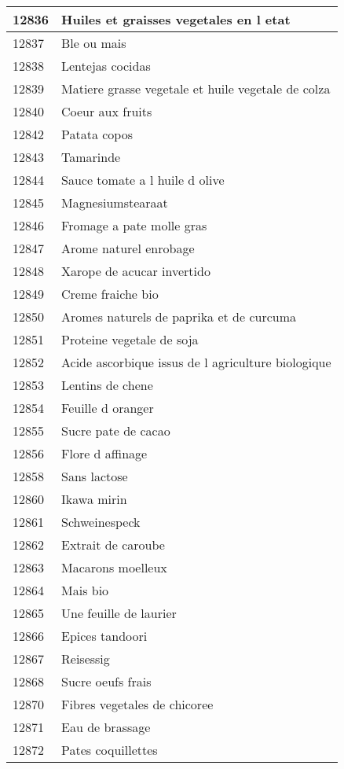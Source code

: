 \begin{longtable}{|l|l|}
12836 & Huiles et graisses vegetales en l etat \\ \hline 
12837 & Ble ou mais \\ \hline 
12838 & Lentejas cocidas \\ \hline 
12839 & Matiere grasse vegetale et huile vegetale de colza \\ \hline 
12840 & Coeur aux fruits \\ \hline 
12842 & Patata copos \\ \hline 
12843 & Tamarinde \\ \hline 
12844 & Sauce tomate a l huile d olive \\ \hline 
12845 & Magnesiumstearaat \\ \hline 
12846 & Fromage a pate molle gras \\ \hline 
12847 & Arome naturel enrobage \\ \hline 
12848 & Xarope de acucar invertido \\ \hline 
12849 & Creme fraiche bio \\ \hline 
12850 & Aromes naturels de paprika et de curcuma \\ \hline 
12851 & Proteine vegetale de soja \\ \hline 
12852 & Acide ascorbique  issus de l agriculture biologique \\ \hline 
12853 & Lentins de chene \\ \hline 
12854 & Feuille d oranger \\ \hline 
12855 & Sucre pate de cacao \\ \hline 
12856 & Flore d affinage \\ \hline 
12858 & Sans lactose \\ \hline 
12860 & Ikawa mirin \\ \hline 
12861 & Schweinespeck \\ \hline 
12862 & Extrait de caroube \\ \hline 
12863 & Macarons moelleux \\ \hline 
12864 & Mais bio \\ \hline 
12865 & Une feuille de laurier \\ \hline 
12866 & Epices tandoori \\ \hline 
12867 & Reisessig \\ \hline 
12868 & Sucre oeufs frais \\ \hline 
12870 & Fibres vegetales de chicoree \\ \hline 
12871 & Eau de brassage \\ \hline 
12872 & Pates coquillettes \\ \hline 

\end{longtable}
